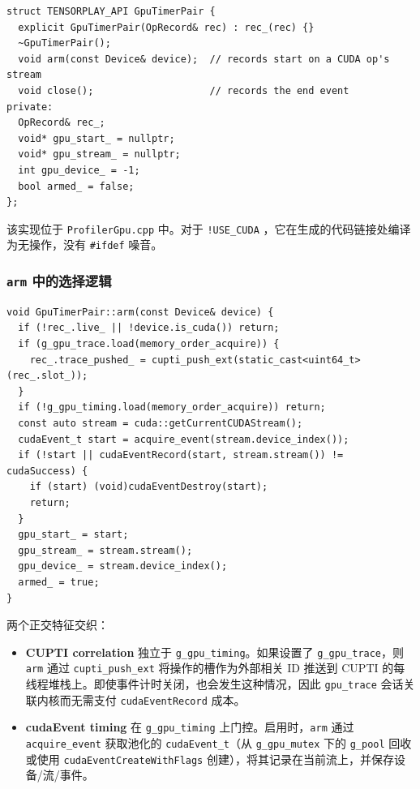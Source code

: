 \begin{lstlisting}[caption={GpuTimerPair handle.}, label=lst:gputimerpair, style=cppstyle]
struct TENSORPLAY_API GpuTimerPair {
  explicit GpuTimerPair(OpRecord& rec) : rec_(rec) {}
  ~GpuTimerPair();
  void arm(const Device& device);  // records start on a CUDA op's stream
  void close();                    // records the end event
private:
  OpRecord& rec_;
  void* gpu_start_ = nullptr;
  void* gpu_stream_ = nullptr;
  int gpu_device_ = -1;
  bool armed_ = false;
};
\end{lstlisting}

该实现位于 \texttt{ProfilerGpu.cpp} 中。对于 \texttt{!USE\_CUDA} ，它在生成的代码链接处编译为无操作，没有 \texttt{\#ifdef} 噪音。

\subsubsection{\texttt{arm} 中的选择逻辑}

\begin{lstlisting}[caption={arm() selection.}, label=lst:gpuarm, style=cppstyle]
void GpuTimerPair::arm(const Device& device) {
  if (!rec_.live_ || !device.is_cuda()) return;
  if (g_gpu_trace.load(memory_order_acquire)) {
    rec_.trace_pushed_ = cupti_push_ext(static_cast<uint64_t>(rec_.slot_));
  }
  if (!g_gpu_timing.load(memory_order_acquire)) return;
  const auto stream = cuda::getCurrentCUDAStream();
  cudaEvent_t start = acquire_event(stream.device_index());
  if (!start || cudaEventRecord(start, stream.stream()) != cudaSuccess) {
    if (start) (void)cudaEventDestroy(start);
    return;
  }
  gpu_start_ = start;
  gpu_stream_ = stream.stream();
  gpu_device_ = stream.device_index();
  armed_ = true;
}
\end{lstlisting}

两个正交特征交织：

\begin{itemize}[leftmargin=1.4em]
\item \textbf{CUPTI correlation} 独立于 \texttt{g\_gpu\_timing}。如果设置了 \texttt{g\_gpu\_trace}，则 \texttt{arm} 通过 \texttt{cupti\_push\_ext} 将操作的槽作为外部相关 ID 推送到 CUPTI 的每线程堆栈上。即使事件计时关闭，也会发生这种情况，因此 \texttt{gpu\_trace} 会话关联内核而无需支付 \texttt{cudaEventRecord} 成本。
\item \textbf{cudaEvent timing} 在 \texttt{g\_gpu\_timing} 上门控。启用时，\texttt{arm} 通过 \texttt{acquire\_event} 获取池化的 \texttt{cudaEvent\_t}（从 \texttt{g\_gpu\_mutex} 下的 \texttt{g\_pool} 回收或使用 \texttt{cudaEventCreateWithFlags} 创建），将其记录在当前流上，并保存设备/流/事件。
\end{itemize}

